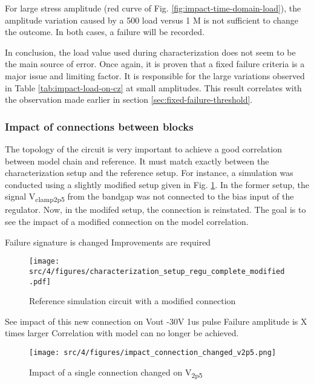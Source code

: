 For large stress amplitude (red curve of Fig. \ref{fig:impact-time-domain-load}), the amplitude variation caused by a 500 \textOmega{} load versus 1 M\textOmega{} is not sufficient to change the outcome.
In both cases, a failure will be recorded.

In conclusion, the load value used during characterization does not seem to be the main source of error.
Once again, it is proven that a fixed failure criteria is a major issue and limiting factor.
It is responsible for the large variations observed in Table \ref{tab:impact-load-on-cz} at small amplitudes.
This result correlates with the observation made earlier in section \ref{sec:fixed-failure-threshold}.

\subsubsection{Impact of connections between blocks}
\label{sec:impact-missing-conns}

The topology of the circuit is very important to achieve a good correlation between model chain and reference.
It must match exactly between the characterization setup and the reference setup.
For instance, a simulation was conducted using a slightly modified setup given in Fig. \ref{fig:reference_simu_circuit}.
In the former setup, the signal V\textsubscript{clamp2p5} from the bandgap was not connected to the bias input of the regulator.
Now, in the modifed setup, the connection is reinstated.
The goal is to see the impact of a modified connection on the model correlation.

Failure signature is changed
Improvements are required

\begin{figure}[!h]
  \centering
  \texttt{[image: src/4/figures/characterization\_setup\_regu\_complete\_modified.pdf]}
  \caption{Reference simulation circuit with a modified connection}
  \label{fig:reference_simu_circuit}
\end{figure}

See impact of this new connection on Vout
-30V 1us pulse
Failure amplitude is X times larger
Correlation with model can no longer be achieved.

\begin{figure}[!h]
  \centering
  \texttt{[image: src/4/figures/impact\_connection\_changed\_v2p5.png]}
  \caption{Impact of a single connection changed on V\textsubscript{2p5}}
  \label{fig:simu_comparison_v2p5_conn}
\end{figure}

